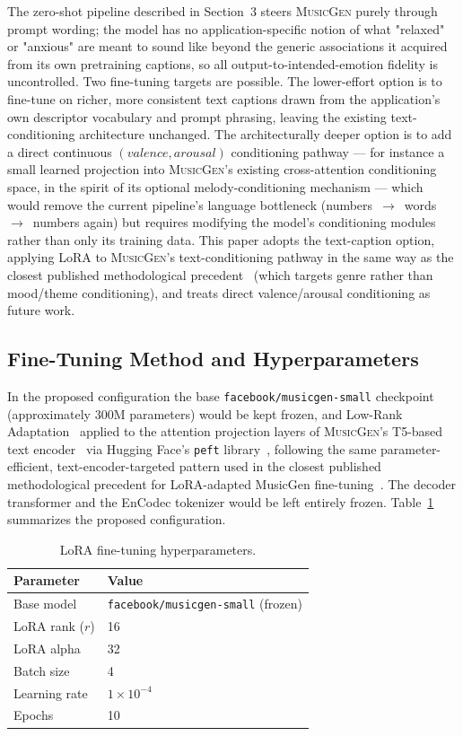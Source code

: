 \documentclass[11pt]{article}
\newcommand{\musicgen}{\textsc{MusicGen}}
\begin{document}
The zero-shot pipeline described in Section~3 steers \musicgen{} purely through prompt wording; the model has no application-specific notion of what "relaxed" or "anxious" are meant to sound like beyond the generic associations it acquired from its own pretraining captions, so all output-to-intended-emotion fidelity is uncontrolled. Two fine-tuning targets are possible. The lower-effort option is to fine-tune on richer, more consistent text captions drawn from the application's own descriptor vocabulary and prompt phrasing, leaving the existing text-conditioning architecture unchanged. The architecturally deeper option is to add a direct continuous $(valence, arousal)$ conditioning pathway --- for instance a small learned projection into \musicgen{}'s existing cross-attention conditioning space, in the spirit of its optional melody-conditioning mechanism --- which would remove the current pipeline's language bottleneck (numbers~$\to$~words~$\to$~numbers again) but requires modifying the model's conditioning modules rather than only its training data. This paper adopts the text-caption option, applying LoRA to \musicgen{}'s text-conditioning pathway in the same way as the closest published methodological precedent~\cite{lee2026loramusicgen} (which targets genre rather than mood/theme conditioning), and treats direct valence/arousal conditioning as future work.

\subsection{Fine-Tuning Method and Hyperparameters}

In the proposed configuration the base \texttt{facebook/musicgen-small} checkpoint (approximately 300M parameters) would be kept frozen, and Low-Rank Adaptation~\cite{hu2022lora} applied to the attention projection layers of \musicgen{}'s T5-based text encoder~\cite{raffel2020t5} via Hugging Face's \texttt{peft} library~\cite{mangrulkar2022peft}, following the same parameter-efficient, text-encoder-targeted pattern used in the closest published methodological precedent for LoRA-adapted MusicGen fine-tuning~\cite{lee2026loramusicgen}. The decoder transformer and the EnCodec tokenizer would be left entirely frozen. Table~\ref{tab:hyperparams} summarizes the proposed configuration.

\begin{table}[t]
\centering
\caption{LoRA fine-tuning hyperparameters.}
\label{tab:hyperparams}
\begin{tabular}{@{}ll@{}}
\toprule
Parameter & Value \\
\midrule
Base model & \texttt{facebook/musicgen-small} (frozen) \\
LoRA rank ($r$) & 16 \\
LoRA alpha & 32 \\
Batch size & 4 \\
Learning rate & $1 \times 10^{-4}$ \\
Epochs & 10 \\
\bottomrule
\end{tabular}
\end{table}
\end{document}

